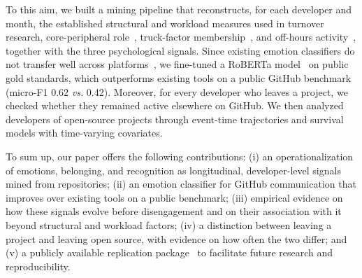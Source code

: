 
To this aim, we built a mining pipeline that reconstructs, for each developer and month, the established structural and workload measures used in turnover research, \ie core-peripheral role~\cite{joblin2017classifying}, truck-factor membership~\cite{avelino2016novel}, and off-hours activity~\cite{claes2018programmers}, together with the three psychological signals. Since existing emotion classifiers do not transfer well across platforms~\cite{novielli2020can,imran2022data}, we fine-tuned a RoBERTa model~\cite{liu2019roberta} on public gold standards, which outperforms existing tools on a public GitHub benchmark (micro-F1 0.62 \textit{vs.} 0.42). Moreover, for every developer who leaves a project, we checked whether they remained active elsewhere on GitHub. We then analyzed  developers of  open-source projects through event-time trajectories and survival models with time-varying covariates.


To sum up, our paper offers the following contributions: (i) an operationalization of emotions, belonging, and recognition as longitudinal, developer-level signals mined from repositories; (ii) an emotion classifier for GitHub communication that improves over existing tools on a public benchmark; (iii) empirical evidence on how these signals evolve before disengagement and on their association with it beyond structural and workload factors; (iv) a distinction between leaving a project and leaving open source, with evidence on how often the two differ; and (v) a publicly available replication package~\cite{replication} to facilitate future research and reproducibility.
